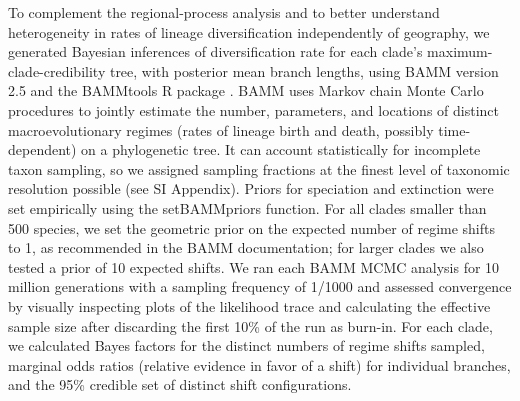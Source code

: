 \documentclass[9pt,twocolumn,twoside,lineno]{pnas-new}
\begin{document}
{To complement the regional-process analysis and to better understand
heterogeneity in rates of lineage diversification independently of
geography, we generated Bayesian inferences of diversification rate
for each clade's maximum-clade-credibility tree, with posterior mean
branch lengths, using BAMM version 2.5 and the BAMMtools R package
\citep{Rabosky2014}. BAMM uses Markov chain Monte Carlo procedures to
jointly estimate the number, parameters, and locations of distinct
macroevolutionary regimes (rates of lineage birth and death, possibly
time-dependent) on a phylogenetic tree. It can account statistically
for incomplete taxon sampling, so we assigned sampling fractions at
the finest level of taxonomic resolution possible (see SI
Appendix). Priors for speciation and extinction were set empirically
using the \textrm{setBAMMpriors} function. For all clades smaller than
500 species, we set the geometric prior on the expected number of
regime shifts to 1, as recommended in the BAMM documentation; for
larger clades we also tested a prior of 10 expected shifts. We ran
each BAMM MCMC analysis for 10 million generations with a sampling
frequency of 1/1000 and assessed convergence by visually inspecting
plots of the likelihood trace and calculating the effective sample
size after discarding the first 10\% of the run as burn-in. For each
clade, we calculated Bayes factors for the distinct numbers of regime
shifts sampled, marginal odds ratios (relative evidence in favor of a
shift) for individual branches, and the 95\% credible set of distinct
shift configurations.}

\showmatmethods


\showacknow %




%
%
\end{document}

